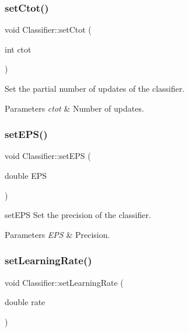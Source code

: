 \subsubsection{\texorpdfstring{set\+Ctot()}{setCtot()}}
{\footnotesize\ttfamily void Classifier\+::set\+Ctot (\begin{DoxyParamCaption}\item[{int}]{ctot }\end{DoxyParamCaption})}



Set the partial number of updates of the classifier. 


\begin{DoxyParams}{Parameters}
{\em ctot} & Number of updates. \\
\hline
\end{DoxyParams}
\mbox{\label{class_classifier_a9cc5a1d92243f9d9b530347be1ac7367}} 
\subsubsection{\texorpdfstring{set\+E\+P\+S()}{setEPS()}}
{\footnotesize\ttfamily void Classifier\+::set\+E\+PS (\begin{DoxyParamCaption}\item[{double}]{E\+PS }\end{DoxyParamCaption})}



set\+E\+PS Set the precision of the classifier. 


\begin{DoxyParams}{Parameters}
{\em E\+PS} & Precision. \\
\hline
\end{DoxyParams}
\mbox{\label{class_classifier_a8f6818bd403afbb46d1bfd75c9731ab6}} 
\subsubsection{\texorpdfstring{set\+Learning\+Rate()}{setLearningRate()}}
{\footnotesize\ttfamily void Classifier\+::set\+Learning\+Rate (\begin{DoxyParamCaption}\item[{double}]{rate }\end{DoxyParamCaption})}



